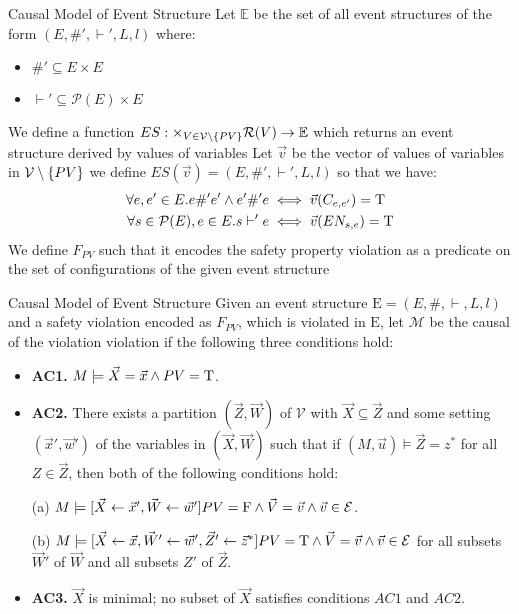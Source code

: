 \begin{frame}{Causal Model of Event Structure}
    Let $\mathbb{E}$ be the set of all event structures of the form
    $(E,\#',\vdash',L,l)$ where:
    \begin{itemize}
        \item $\#' \subseteq E \times E$
        \item $\vdash' \subseteq \mathcal{P}(E) \times E$
    \end{itemize}
    We define a function 
    $ES: \times_{V \in \mathcal{V}\setminus \{PV\}} \mathcal{R}(V) \rightarrow \mathbb{E}$
    which returns an event structure derived by values of variables
    Let $\vec v$ be the vector of values of variables in 
    $\mathcal{V} \setminus \{PV\}$
    we define $ES(\vec v) = (E,\#',\vdash', L,l)$ so that we have:
    \begin{align*}
        \forall e,e' \in E. e \#' e' \wedge e' \#' e
         & \iff \vec{v}(C_{e,e'}) = \mathrm{T} \\
        \forall s \in \mathcal{P}(E), e \in E.  s \vdash' e
         & \iff \vec{v}(EN_{s,e}) = \mathrm{T}
    \end{align*}
    We define $F_{PV}$ such that it encodes the safety property violation as a predicate on the set of configurations 
    of the given event structure
\end{frame}

\begin{frame}{Causal Model of Event Structure}
    Given an event structure $\mathrm{E} = (E,\#,\vdash,L,l)$
    and a safety violation encoded as $F_{PV}$, which is violated
    in $\mathrm{E}$, let $\mathcal{M}$ be the causal of the violation
    violation if the following three conditions hold:
    \begin{itemize}
        \item  \textbf{AC1.} $M\models \vec X = \vec x
                  \wedge PV = \mathrm{T}$.
        \item  \textbf{AC2. }There exists a partition $(\vec Z, \vec W)$ of $\mathcal{V}$ with $\vec X \subseteq \vec Z$ and some setting $(\vec x',\vec w')$ of the variables in $(\vec X,\vec W)$ such that if $(M,\vec u)\models \vec Z = z^*$ for all $Z\in \vec Z$, then both of the following conditions hold:

              (a) $M \models[\vec X \leftarrow \vec x', \vec W \leftarrow \vec w']
                  PV = \mathrm{F}
                  \wedge \vec V = \vec v
                  \wedge  \vec v \in \mathcal{E}$.

              (b) $M \models[\vec X\leftarrow \vec x, \vec W' \leftarrow \vec w', \vec Z'\leftarrow \vec z^*]
                  PV = \mathrm{T}
                  \wedge \vec V = \vec v
                  \wedge \vec v \in \mathcal{E}$
              for all subsets $\vec W'$ of $\vec W$ and all subsets $Z'$ of $\vec Z$.

        \item  \textbf{AC3.} $\vec X$ is minimal; no subset of $\vec X$ satisfies conditions $AC1$ and $AC2$.
    \end{itemize}
\end{frame}


